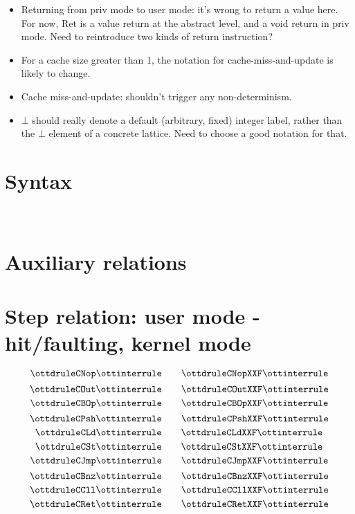 \documentclass{article}
\begin{document}
\begin{itemize}
\begin{itemize}
      (saving one rule), or make it step, but observe that the tmu
      fault handler code do use output instruction. Made it blocking
      for now.
    \item Returning from priv mode to user mode: it's wrong
      to return a value here. For now, Ret is a value return at the
      abstract level, and a void return in priv mode. Need to
      reintroduce two kinds of return instruction?
    \item For a cache size greater than 1, the notation for
      cache-miss-and-update is likely to change.
    \item Cache miss-and-update: shouldn't trigger any non-determinism.
    \item $\bot$ should really denote a default (arbitrary, fixed)
      integer label, rather than the $\bot$ element of a concrete lattice.
      Need to choose a good notation for that.
  \end{itemize}
\end{itemize}

\section*{Syntax}

\ottmetavars\\[3ex]

\ottgrammartabular{
\ottn\ottinterrule
\ottpriv\ottinterrule
\ottT\ottinterrule
\ottC\ottinterrule
\ottki\ottinterrule
\ottko\ottinterrule
\ottkbot\ottinterrule
\ottca\ottinterrule
\ottinstr\ottinterrule
\ottcS\ottinterrule
}

\section*{Auxiliary relations}

\ottgrammartabular{
\ottformula\ottinterrule
}

\clearpage
\section*{Step relation: user mode - hit/faulting, kernel mode}

\[ \ottdruleCNop \ottinterrule 
   \quad \quad \ottdruleCNopXXF \ottinterrule \]
\[ \ottdruleCOut \ottinterrule
   \quad \quad  \ottdruleCOutXXF \ottinterrule \]
\[ \ottdruleCBOp \ottinterrule
   \quad \quad \ottdruleCBOpXXF \ottinterrule \]
\[ \ottdruleCPsh \ottinterrule 
   \quad \quad \ottdruleCPshXXF \ottinterrule \]
 \[ \ottdruleCLd \ottinterrule 
   \quad \quad \ottdruleCLdXXF \ottinterrule \]
\[ \ottdruleCSt \ottinterrule
   \quad \quad \ottdruleCStXXF \ottinterrule \]
\[ \ottdruleCJmp \ottinterrule
   \quad \quad \ottdruleCJmpXXF \ottinterrule \]
\[ \ottdruleCBnz \ottinterrule 
   \quad \quad  \ottdruleCBnzXXF \ottinterrule  \] 
\[ \ottdruleCCll \ottinterrule
   \quad \quad  \ottdruleCCllXXF \ottinterrule \]
\[ \ottdruleCRet \ottinterrule   
   \quad \quad  \ottdruleCRetXXF \ottinterrule \]
\end{document}
